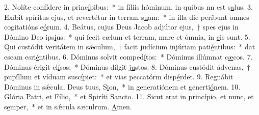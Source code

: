 2. Nolíte confídere in princ\uline{í}pibus:~* in fíliis hóminum, in quibus nn est s\uline{a}lus.
3. Exíbit spíritus ejus, et revertétur in terram s\uline{u}am:~* in illa die períbunt omnes cogitatións e\uline{ó}rum.
4. Beátus, cujus Deus Jacob adjútor ejus,~† spes ejus in Dómino Deo ips\uline{í}us:~* qui fecit cælum et terram, mare et ómnia,  in \uline{e}is sunt.
5. Qui custódit veritátem in sǽculum,~† facit judícium injúriam pati\uline{é}ntibus:~* dat escam esri\uline{é}ntibus.
6. Dóminus solvit comped\uline{í}tos:~* Dóminus illúmnat c\uline{æ}cos.
7. Dóminus érigit el\uline{í}sos:~* Dóminus dílgit j\uline{u}stos.
8. Dóminus custódit ádvenas,~† pupíllum et víduam susc\uline{í}piet:~* et vias peccatórm disp\uline{é}rdet.
9. Regnábit Dóminus in sǽcula, Deus tuus, S\uline{i}on,~* in generatiónem et generti\uline{ó}nem.
10. Glória Patri, et F\uline{í}lio,~* et Spiríti S\uline{a}ncto.
11. Sicut erat in princípio, et nunc, et s\uline{e}mper,~* et in sǽcula sæculrum. \uline{A}men.
